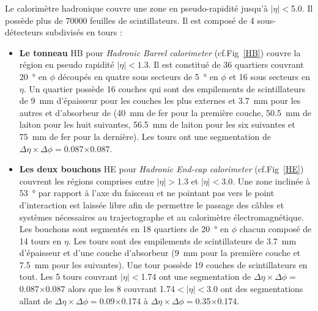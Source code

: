 Le calorimètre hadronique couvre une zone en pseudo-rapidité jusqu'à $|\eta|<$\num{5.0}. Il possède plus de \num{70000} feuilles de scintillateurs. Il est composé de \num{4} sous-détecteurs subdivisés en tours : 
\begin{itemize}[label=$\bullet$]
	\item \textbf{Le tonneau} HB pour \textit{Hadronic Barrel calorimeter} (cf.Fig~\ref{HB}) couvre la région en pseudo rapidité $|\eta|<1.3$. Il est constitué de \num{36} quartiers couvrant \SI{20}{\degree} en $\phi$ découpés en quatre sous secteurs de \SI{5}{\degree} en $\phi$ et \num{16} sous secteurs en $\eta$. Un quartier possède \num{16} couches qui sont des empilements de scintillateurs de \SI{9}{\milli\meter} d'épaisseur pour les couches les plus externes et \SI{3.7}{\milli\meter} pour les autres et d'absorbeur de (\SI{40}{\milli\meter} de fer pour la première couche, \SI{50.5}{\milli\meter} de laiton pour les huit suivantes, \SI{56.5}{\milli\meter} de laiton pour les six suivantes et \SI{75}{\milli\meter} de fer pour la dernière). Les tours ont une segmentation de $\Delta\eta\times\Delta\phi=$\num{0.087}$\times$\num{0.087}.
	\item \textbf{Les deux bouchons} HE pour \textit{Hadronic End-cap calorimeter} (cf.Fig~\ref{HE}) couvrent les régions comprises entre $|\eta|>$\num{1.3} et $|\eta|<$\num{3.0}. Une zone inclinée à \SI{53}{\degree} par rapport à l'axe du faisceau et ne pointant pas vers le point d'interaction est laissée libre afin de permettre le passage des câbles et systèmes nécessaires au trajectographe et au calorimètre électromagnétique. Les bouchons sont segmentés en \num{18} quartiers de \SI{20}{\degree} en $\phi$ chacun composé de \num{14} tours en $\eta$. Les tours sont des empilements de scintillateurs de \SI{3.7}{\milli\meter} d'épaisseur et d'une couche d'absorbeur (\SI{9}{\milli\meter} pour la première couche et \SI{7.5}{\milli\meter} pour les suivantes). Une tour possède \num{19} couches de  scintillateurs en tout. Les \num{5} tours couvrant $|\eta|<$\num{1.74} ont une segmentation de $\Delta\eta\times\Delta\phi=$\num{0.087}$\times$\num{0.087} alors que les \num{8} couvrant \num{1.74}$<|\eta|<$\num{3.0} ont des segmentations allant de $\Delta\eta\times\Delta\phi=$\num{0.09}$\times$\num{0.174} à $\Delta\eta\times\Delta\phi=$\num{0.35}$\times$\num{0.174}.

\end{itemize}

